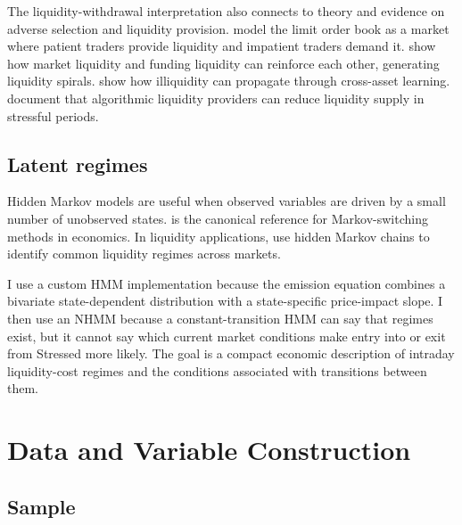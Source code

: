 \documentclass[12pt,a4paper]{article}
\begin{document}
The liquidity-withdrawal interpretation also connects to theory and evidence on adverse selection and liquidity provision. \citet{FoucaultKadanKandel2005} model the limit order book as a market where patient traders provide liquidity and impatient traders demand it. \citet{BrunnermeierPedersen2009} show how market liquidity and funding liquidity can reinforce each other, generating liquidity spirals. \citet{CespaFoucault2014} show how illiquidity can propagate through cross-asset learning. \citet{RamanRobeYadav2020} document that algorithmic liquidity providers can reduce liquidity supply in stressful periods.

\subsection{Latent regimes}\label{sec:literature_regimes}

Hidden Markov models are useful when observed variables are driven by a small number of unobserved states. \citet{Hamilton1989} is the canonical reference for Markov-switching methods in economics. In liquidity applications, \citet{FloodLiechtyPiontek2016} use hidden Markov chains to identify common liquidity regimes across markets.

I use a custom HMM implementation because the emission equation combines a bivariate state-dependent distribution with a state-specific price-impact slope. I then use an NHMM because a constant-transition HMM can say that regimes exist, but it cannot say which current market conditions make entry into or exit from Stressed more likely. The goal is a compact economic description of intraday liquidity-cost regimes and the conditions associated with transitions between them.

\section{Data and Variable Construction}\label{sec:data}

\subsection{Sample}\label{sec:sample}
\end{document}
